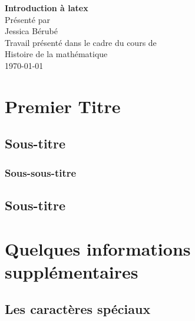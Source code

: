 \documentclass[12pt,twoside,a4paper]{article}
\begin{document}
	
	\linespread{1,5} %
	\thispagestyle{empty} %
	\begin{center} %
		\textbf{Introduction à latex} \\
		\vspace{6 cm}
		Présenté par\\
		Jessica Bérubé \\
		\vspace{6 cm}
		Travail présenté dans le cadre du cours de\\
		Histoire de la mathématique\\
		\vspace{6 cm}
		\today 
	\end{center} %
	\newpage %
	
	
	\setcounter{page}{1} %
	\tableofcontents %
	
	\newpage  %
	
	\listoffigures %
	
	\newpage
	
	\section{Premier Titre}

	\subsection{Sous-titre}
	
	\subsubsection{Sous-sous-titre}

	\subsection{Sous-titre}
	
	\newpage
	
	\section{Quelques informations supplémentaires}
	
	\subsection{Les caractères spéciaux}
	
\end{document}

